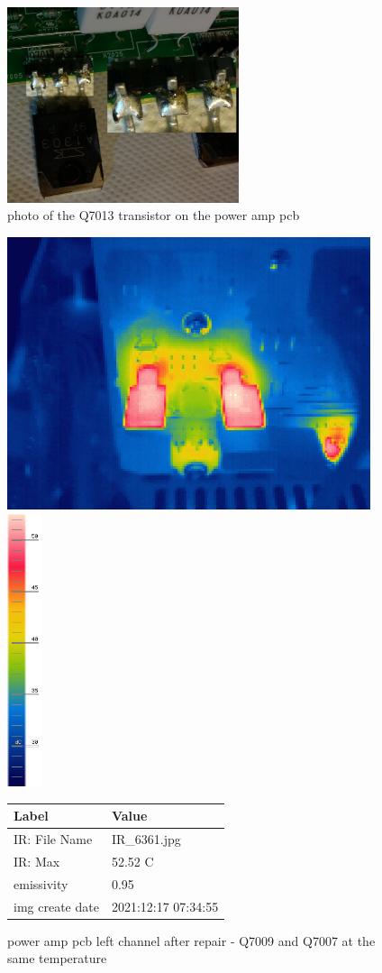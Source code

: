 \documentclass[a4paper,twoside]{report}
\begin{document}
\begin{figure}[hptb!]
\centering
 \includegraphics[width=6.8cm, keepaspectratio=true]{img_report/q7013}
 \caption{photo of the Q7013 transistor on the power amp pcb}
 \label{fig:q7013}
\end{figure}

\begin{figure}[hptb!]
 \centering
 \includegraphics[height=8cm, keepaspectratio=true]{img_report/IR_6361}
 \includegraphics[height=8cm, keepaspectratio=true]{img_report/IR_6361_scale}

 \vspace*{5mm}
 \begin{tabular}{ l | l }
  Label & Value \\ \hline
  IR: File Name & IR\_6361.jpg \\
  IR: Max & 52.52 C \\
  emissivity & 0.95 \\
  img create date & 2021:12:17 07:34:55
 \end{tabular}

 \caption{power amp pcb left channel after repair - Q7009 and Q7007 at the same temperature}
\end{figure}
\end{document}

